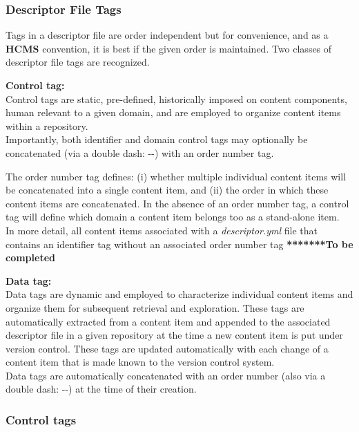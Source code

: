 \documentclass[12pt]{article}
\begin{document}
\subsubsection*{Descriptor File Tags}

Tags in a descriptor file are order independent but for convenience, and as a {\bf \small HCMS} convention, it is best if the given order is maintained. Two classes of descriptor file tags are recognized. 

\begin{description}
\item {\bf Control tag:}\\
Control tags are static, pre-defined, historically imposed on content components, human relevant to a given domain, and are employed to organize content items within a repository.\\
Importantly, both identifier and domain control tags may optionally be concatenated (via a double dash: -{}-) with an order number tag. 

The order number tag defines: (i) whether multiple individual content items will be concatenated into a single content item, and (ii) the order in which these content items are concatenated. In the absence of an order number tag, a control tag will define which domain a content item belongs too as a stand-alone item.\\
In more detail, all content items associated with a {\it descriptor.yml} file that contains an identifier tag without an associated order number tag {\bf ********To be completed}
\item {\bf Data tag:}\\
Data tags are dynamic and employed to characterize individual content items and organize them for subsequent retrieval and exploration. These tags are automatically extracted from a content item and appended to the associated descriptor file in a given repository at the time a new content item is put under version control. These tags are updated automatically with each change of a content item that is made known to the version control system.\\
Data tags are automatically concatenated with an order number (also via a double dash: -{}-) at the time of their creation.
\end{description}

\subsubsection*{Control tags}
\end{document}
